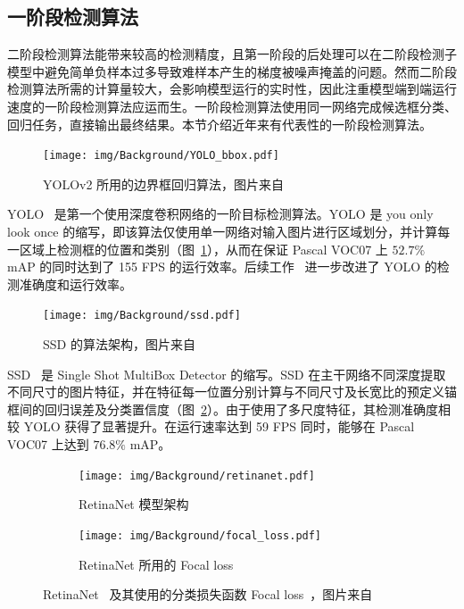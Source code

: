 \documentclass[
  fontset = mac,
]{shtthesis}
\begin{document}
\subsection{一阶段检测算法}
二阶段检测算法能带来较高的检测精度，且第一阶段的后处理可以在二阶段检测子模型中避免简单负样本过多导致难样本产生的梯度被噪声掩盖的问题。然而二阶段检测算法所需的计算量较大，会影响模型运行的实时性，因此注重模型端到端运行速度的一阶段检测算法应运而生。一阶段检测算法使用同一网络完成候选框分类、回归任务，直接输出最终结果。本节介绍近年来有代表性的一阶段检测算法。

\begin{figure}[htb]
  \centering
  \texttt{[image: img/Background/YOLO\_bbox.pdf]}
  \caption{YOLOv2 所用的边界框回归算法，图片来自~\citet{redmon2017yolo9000}}
  \label{img::background::yolo_bbox}
\end{figure}

YOLO~\citep{redmon2016you} 是第一个使用深度卷积网络的一阶目标检测算法。YOLO 是 you only look once 的缩写，即该算法仅使用单一网络对输入图片进行区域划分，并计算每一区域上检测框的位置和类别（图~\ref{img::background::yolo_bbox}），从而在保证 Pascal VOC07 上 $52.7\%$ mAP 的同时达到了 155 FPS 的运行效率。后续工作~\citet{redmon2017yolo9000, redmon2018yolov3} 进一步改进了 YOLO 的检测准确度和运行效率。

\begin{figure}[htb]
  \centering
  \texttt{[image: img/Background/ssd.pdf]}
  \caption{SSD 的算法架构，图片来自~\citet{liu2016ssd}}
  \label{img::background::ssd}
\end{figure}

SSD~\citep{liu2016ssd} 是 Single Shot MultiBox Detector 的缩写。SSD 在主干网络不同深度提取不同尺寸的图片特征，并在特征每一位置分别计算与不同尺寸及长宽比的预定义锚框间的回归误差及分类置信度（图~\ref{img::background::ssd}）。由于使用了多尺度特征，其检测准确度相较 YOLO 获得了显著提升。在运行速率达到 59 FPS 同时，能够在 Pascal VOC07 上达到 $76.8\%$ mAP。

\begin{figure}[htb]
  \centering
  \begin{subfigure}[t]{0.65\columnwidth}
    \texttt{[image: img/Background/retinanet.pdf]}
    \caption{RetinaNet 模型架构}
    \label{img::background::retina_net}
  \end{subfigure}
  \quad
  \begin{subfigure}[t]{0.3\columnwidth}
    \texttt{[image: img/Background/focal\_loss.pdf]}
    \caption{RetinaNet 所用的 Focal loss}
    \label{img::background::focal_loss}
  \end{subfigure}
  \caption{RetinaNet~ 及其使用的分类损失函数 Focal loss~，图片来自~\citet{lin2017focal}}
  \label{img::background::retinanet_focalloss}
\end{figure}
\end{document}
